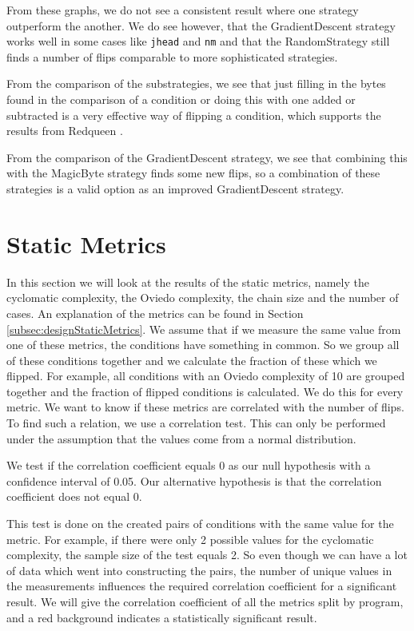 From these graphs, we do not see a consistent result where one strategy outperform the another. We do see however, that the GradientDescent strategy works well in some cases like \texttt{jhead} and \texttt{nm} and that the RandomStrategy still finds a number of flips comparable to more sophisticated strategies.

From the comparison of the substrategies, we see that just filling in the bytes found in the comparison of a condition or doing this with one added or subtracted is a very effective way of flipping a condition, which supports the results from Redqueen \cite{aschermann2019redqueen}. 

From the comparison of the GradientDescent strategy, we see that combining this with the MagicByte strategy finds some new flips, so a combination of these strategies is a valid option as an improved GradientDescent strategy.


\section{Static Metrics}
In this section we will look at the results of the static metrics, namely the cyclomatic complexity, the Oviedo complexity, the chain size and the number of cases. An explanation of the metrics can be found in Section \ref{subsec:designStaticMetrics}. We assume that if we measure the same value from one of these metrics, the conditions have something in common. So we group all of these conditions together and we calculate the fraction of these which we flipped. For example, all conditions with an Oviedo complexity of 10 are grouped together and the fraction of flipped conditions is calculated. We do this for every metric.
We want to know if these metrics are correlated with the number of flips. To find such a relation, we use a correlation test. This can only be performed under the assumption that the values come from a normal distribution. 

We test if the correlation coefficient equals 0 as our null hypothesis with a confidence interval of 0.05. Our alternative hypothesis is that the correlation coefficient does not equal 0.

This test is done on the created pairs of conditions with the same value for the metric. For example, if there were only 2 possible values for the cyclomatic complexity, the sample size of the test equals 2. So even though we can have a lot of data which went into constructing the pairs, the number of unique values in the measurements influences the required correlation coefficient for a significant result.
We will give the correlation coefficient of all the metrics split by program, and a red background indicates a statistically significant result.


